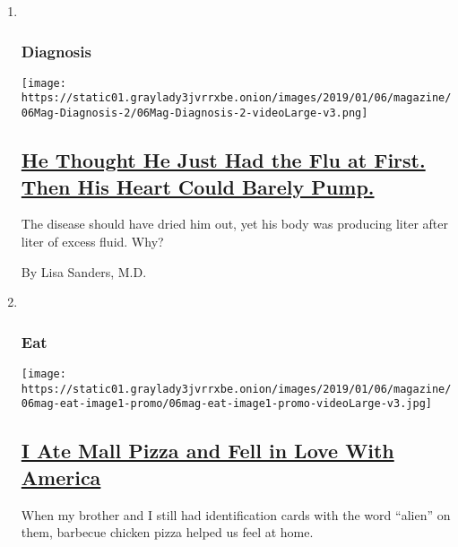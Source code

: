 \begin{enumerate}
\def\labelenumi{\arabic{enumi}.}
\item ~
  \hypertarget{diagnosis}{%
  \subsubsection{Diagnosis}\label{diagnosis}}

  \texttt{[image: https://static01.graylady3jvrrxbe.onion/images/2019/01/06/magazine/06Mag-Diagnosis-2/06Mag-Diagnosis-2-videoLarge-v3.png]}

  \hypertarget{he-thought-he-just-had-the-flu-at-first-then-his-heart-could-barely-pump}{%
  \subsection{\texorpdfstring{\href{/2019/01/02/magazine/the-disease-should-have-dried-him-out-yet-his-body-was-producing-liter-after-liter-of-excess-fluid-why.html}{He
  Thought He Just Had the Flu at First. Then His Heart Could Barely
  Pump.}}{He Thought He Just Had the Flu at First. Then His Heart Could Barely Pump.}}\label{he-thought-he-just-had-the-flu-at-first-then-his-heart-could-barely-pump}}

  The disease should have dried him out, yet his body was producing
  liter after liter of excess fluid. Why?

  By Lisa Sanders, M.D.
\item ~
  \hypertarget{eat}{%
  \subsubsection{Eat}\label{eat}}

  \texttt{[image: https://static01.graylady3jvrrxbe.onion/images/2019/01/06/magazine/06mag-eat-image1-promo/06mag-eat-image1-promo-videoLarge-v3.jpg]}

  \hypertarget{i-ate-mall-pizza-and-fell-in-love-with-america}{%
  \subsection{\texorpdfstring{\href{/2019/01/03/magazine/bbq-chicken-pizza-recipe.html}{I
  Ate Mall Pizza and Fell in Love With
  America}}{I Ate Mall Pizza and Fell in Love With America}}\label{i-ate-mall-pizza-and-fell-in-love-with-america}}

  When my brother and I still had identification cards with the word
  ``alien'' on them, barbecue chicken pizza helped us feel at home.


\end{enumerate}
